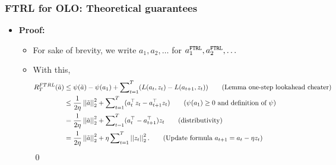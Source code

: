 \documentclass[11pt,compress,t,notes=noshow, xcolor=table]{beamer}
\begin{document}
\begin{frame} 
	\frametitle{FTRL for OLO: Theoretical guarantees}
	\small
	\begin{itemize}
		\footnotesize
		
		\item \textbf{Proof:}
		\begin{itemize}\footnotesize
			
			 \item 	For sake of brevity, we write $a_1, a_2, \ldots$ for $a_1^{\texttt{FTRL}}, a_2^{\texttt{FTRL}}, \ldots$ 
			 \item With this,
			\begin{align*}
				R_T^{FTRL}(\tilde a) &\leq \reg(\tilde a) - \reg(a_1) + \sum\nolimits_{t=1}^T (\l(a_t,z_t) - \l(a_{t+1},z_t)) \tag{Lemma one-step lookahead cheater} \\
				 &\leq \frac{1}{2\eta}  \norm{\tilde a}^2 + \sum\nolimits_{t=1}^T ( a_t^\top z_t  -  a_{t+1}^\top z_t  ) \tag{$\reg(a_1)\geq 0$ and definition of $\reg$} \\
				 &= \frac{1}{2\eta}  \norm{\tilde a}^2 + \sum\nolimits_{t=1}^T  ( a_t^\top-  a_{t+1}^\top   )z_t \tag{distributivity} \\
				 &= \frac{1}{2\eta}  \norm{\tilde a}^2 + \eta \sum\nolimits_{t=1}^T   \norm{z_t}^2.  \tag{Update formula $	a_{t+1} = a_t - \eta z_t$}
			\end{align*}
			\qed
		\end{itemize}
%		
	\end{itemize}
\end{frame}
\end{document}
